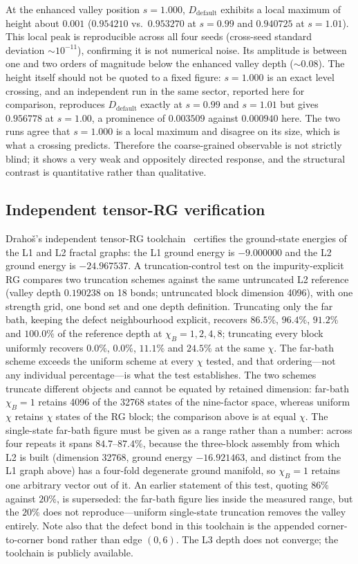 \documentclass[aps,prb,reprint,superscriptaddress]{revtex4-2}
\begin{document}
At the enhanced valley position $s=1.000$, $D_{\text{default}}$ exhibits a local maximum of height about $0.001$ ($0.954210$ vs.\ $0.953270$ at $s=0.99$ and $0.940725$ at $s=1.01$). This local peak is reproducible across all four seeds (cross-seed standard deviation $\sim10^{-11}$), confirming it is not numerical noise. Its amplitude is between one and two orders of magnitude below the enhanced valley depth ($\sim0.08$). The height itself should not be quoted to a fixed figure: $s=1.000$ is an exact level crossing, and an independent run in the same sector, reported here for comparison, reproduces $D_{\text{default}}$ exactly at $s=0.99$ and $s=1.01$ but gives $0.956778$ at $s=1.00$, a prominence of $0.003509$ against $0.000940$ here. The two runs agree that $s=1.000$ is a local maximum and disagree on its size, which is what a crossing predicts. Therefore the coarse-grained observable is not strictly blind; it shows a very weak and oppositely directed response, and the structural contrast is quantitative rather than qualitative.

\subsection{Independent tensor-RG verification}

Draho\v{s}'s independent tensor-RG toolchain~\cite{Drahos2026GitHub} certifies the ground-state energies of the L1 and L2 fractal graphs: the L1 ground energy is $-9.000000$ and the L2 ground energy is $-24.967537$. A truncation-control test on the impurity-explicit RG compares two truncation schemes against the same untruncated L2 reference (valley depth $0.190238$ on 18 bonds; untruncated block dimension 4096), with one strength grid, one bond set and one depth definition. Truncating only the far bath, keeping the defect neighbourhood explicit, recovers $86.5\%$, $96.4\%$, $91.2\%$ and $100.0\%$ of the reference depth at $\chi_B=1,2,4,8$; truncating every block uniformly recovers $0.0\%$, $0.0\%$, $11.1\%$ and $24.5\%$ at the same $\chi$. The far-bath scheme exceeds the uniform scheme at every $\chi$ tested, and that ordering---not any individual percentage---is what the test establishes. The two schemes truncate different objects and cannot be equated by retained dimension: far-bath $\chi_B=1$ retains 4096 of the 32768 states of the nine-factor space, whereas uniform $\chi$ retains $\chi$ states of the RG block; the comparison above is at equal $\chi$. The single-state far-bath figure must be given as a range rather than a number: across four repeats it spans $84.7$--$87.4\%$, because the three-block assembly from which L2 is built (dimension 32768, ground energy $-16.921463$, and distinct from the L1 graph above) has a four-fold degenerate ground manifold, so $\chi_B=1$ retains one arbitrary vector out of it. An earlier statement of this test, quoting $86\%$ against $20\%$, is superseded: the far-bath figure lies inside the measured range, but the $20\%$ does not reproduce---uniform single-state truncation removes the valley entirely. Note also that the defect bond in this toolchain is the appended corner-to-corner bond rather than edge $(0,6)$. The L3 depth does not converge; the toolchain is publicly available.
\end{document}
